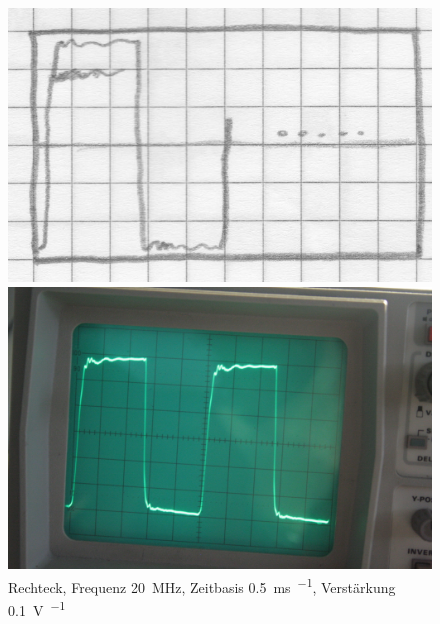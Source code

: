 \begin{figure}
	\centering
	\begin{minipage}{.45\linewidth}
	\includegraphics[width=\linewidth]{Skizzen/IMG_0749-1500.jpg}
	\end{minipage}
	\hfill
	\begin{minipage}{.45\linewidth}
	\includegraphics[width=\linewidth]{Fotos/IMG_0749-1500.jpg}
	\end{minipage}
	\caption{%
		Rechteck, Frequenz \SI{20}{\mega\hertz}, Zeitbasis \SI{.5}{\milli\second\per\division}, Verstärkung \SI{.1}{\volt\per\division}
	}
	\label{fig:0749}
\end{figure}


